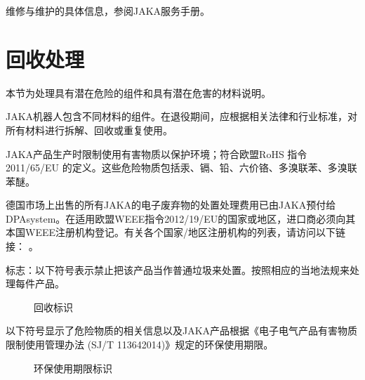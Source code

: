 \documentclass[a4paper,11pt,english,openany,oneside]{sphinxmanual}
\begin{document}
\sphinxAtStartPar
维修与维护的具体信息，参阅JAKA服务手册。

\sphinxstepscope


\chapter{回收处理}
\label{\detokenize{10 _u56de_u6536_u5904_u7406:id1}}\label{\detokenize{10 _u56de_u6536_u5904_u7406::doc}}
\sphinxAtStartPar
本节为处理具有潜在危险的组件和具有潜在危害的材料说明。

\sphinxAtStartPar
JAKA机器人包含不同材料的组件。在退役期间，应根据相关法律和行业标准，对所有材料进行拆解、回收或重复使用。

\sphinxAtStartPar
{}

\sphinxAtStartPar
JAKA产品生产时限制使用有害物质以保护环境；符合欧盟RoHS 指令2011/65/EU 的定义。这些危险物质包括汞、镉、铅、六价铬、多溴联苯、多溴联苯醚。

\sphinxAtStartPar
{}

\sphinxAtStartPar
德国市场上出售的所有JAKA的电子废弃物的处置处理费用已由JAKA预付给DPA\sphinxhyphen{}system。在适用欧盟WEEE指令2012/19/EU的国家或地区，进口商必须向其本国WEEE注册机构登记。有关各个国家/地区注册机构的列表，请访问以下链接：  。

\sphinxAtStartPar
标志：以下符号表示禁止把该产品当作普通垃圾来处置。按照相应的当地法规来处理每件产品。

\begin{figure}[H]
\centering
\capstart

\noindent{}
\caption{回收标识}\label{\detokenize{10 _u56de_u6536_u5904_u7406:id2}}\end{figure}



\sphinxAtStartPar
{}

\sphinxAtStartPar
以下符号显示了危险物质的相关信息以及JAKA产品根据《电子电气产品有害物质 限制使用管理办法 (SJ/T 11364\sphinxhyphen{}2014)》规定的环保使用期限。

\begin{figure}[H]
\centering
\capstart

\noindent{}
\caption{环保使用期限标识}\label{\detokenize{10 _u56de_u6536_u5904_u7406:id3}}\end{figure}
\end{document}
